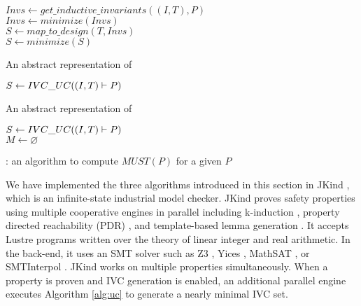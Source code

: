 \begin{algorithm}
  \BlankLine
  $Invs \leftarrow get\_inductive\_invariants((I, T), P)$ \\
  $Invs \leftarrow minimize(Invs)$ \\
  $S \leftarrow map\_to\_design (T, Invs)$ \\
  $S \leftarrow minimize(S)$ \\
\caption{An abstract representation of \ucalg \cite{Ghass16}}
\label{alg:uc}
\end{algorithm}

\begin{algorithm}
  \BlankLine
  $S \leftarrow {IVC\_UC}((I, T) \vdash P)$ \\
   {
  }
\caption{An abstract representation of \ucbfalg \cite{Ghass16}}
\label{alg:ucbf}
\end{algorithm}


\begin{algorithm}
  \BlankLine
  $S \leftarrow {IVC\_UC}((I, T) \vdash P)$ \\
  $M \leftarrow \varnothing$ \\
   {
  }
\caption{\mustalg: an algorithm to compute $MUST(P)$ for a given $P$}
\label{alg:must}
\end{algorithm}

We have implemented the three algorithms introduced in this section in JKind \cite{jkind}, which is an infinite-state industrial model checker. JKind proves safety properties using multiple cooperative engines in parallel including k-induction \cite{SheeranSS00}, property directed reachability (PDR) \cite{Een2011:PDR}, and template-based lemma generation \cite{Kahsai2011}. It accepts
Lustre programs written over the theory of linear integer and real
arithmetic. In the back-end, it uses an SMT solver such as
Z3 \cite{DeMoura08:z3}, Yices \cite{Dutertre06:yices},
MathSAT \cite{Cimatti2013:MathSAT}, or SMTInterpol \cite{Christ2012:SMTInterpol}.
JKind works on multiple properties simultaneously. When a
property is proven and IVC generation is enabled, an additional
parallel engine executes Algorithm \ref{alg:uc} to generate a nearly minimal
IVC set.

